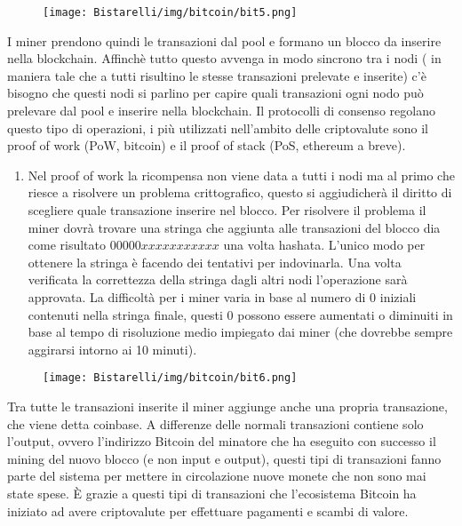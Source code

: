 \begin{figure}[H]
	\centering
    \texttt{[image: Bistarelli/img/bitcoin/bit5.png]}
\end{figure}

I miner prendono quindi le transazioni dal pool e formano un blocco da inserire nella blockchain. Affinchè tutto
questo avvenga in modo sincrono tra i nodi ( in maniera tale che a tutti risultino le stesse transazioni prelevate e
inserite) c’è bisogno che questi nodi si parlino per capire quali transazioni ogni nodo può prelevare dal pool e
inserire nella blockchain. Il protocolli di consenso regolano questo tipo di operazioni, i più utilizzati nell’ambito
delle criptovalute sono il proof of work (PoW, bitcoin) e il proof of stack (PoS, ethereum a breve).

\begin{enumerate}
    \item Nel proof of work la ricompensa non viene data a tutti i nodi ma al primo che riesce a risolvere un problema crittografico, questo si aggiudicherà il diritto di scegliere quale transazione inserire nel blocco. Per risolvere il problema il miner dovrà trovare una stringa che aggiunta alle transazioni del blocco dia come risultato $00000xxxxxxxxxxx$ una volta hashata. L’unico modo per ottenere la stringa è facendo dei tentativi per indovinarla. Una volta verificata la correttezza della stringa dagli altri nodi l’operazione sarà approvata. La difficoltà per i miner varia in base al numero di 0 iniziali contenuti nella stringa finale, questi 0 possono essere aumentati o diminuiti in base al tempo di risoluzione medio impiegato dai miner (che dovrebbe sempre aggirarsi intorno ai 10 minuti).
\end{enumerate}

\begin{figure}[H]
	\centering
    \texttt{[image: Bistarelli/img/bitcoin/bit6.png]}
\end{figure}

Tra tutte le transazioni inserite il miner aggiunge anche una propria transazione, che viene detta coinbase. A
differenze delle normali transazioni contiene solo l’output, ovvero l'indirizzo Bitcoin del minatore che ha eseguito
con successo il mining del nuovo blocco (e non input e output), questi tipi di transazioni fanno parte del sistema
per mettere in circolazione nuove monete che non sono mai state spese. È grazie a questi tipi di transazioni che
l'ecosistema Bitcoin ha iniziato ad avere criptovalute per effettuare pagamenti e scambi di valore.

